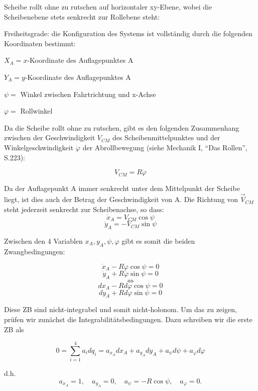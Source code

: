 \documentclass[10pt, letterpaper]{article}
\begin{document}
Scheibe rollt ohne zu rutschen auf horizontaler xy-Ebene, wobei die Scheibenebene stets senkrecht zur Rollebene steht:

Freiheitsgrade: die Konfiguration des Systems ist vollständig durch die folgenden Koordinaten bestimmt:

$X_A = x$-Koordinate des Auflagepunktes A

$Y_A = y$-Koordinate des Auflagepunktes A

$\psi = $ Winkel zwischen Fahrtrichtung und x-Achse

$\varphi = $ Rollwinkel

Da die Scheibe rollt ohne zu rutschen, gibt es den folgenden Zusammenhang zwischen der Geschwindigkeit $V_{CM}$ des Scheibenmittelpunktes und der Winkelgeschwindigkeit $\dot{\varphi}$ der Abrollbewegung (siehe Mechanik I, ``Das Rollen'', S.223):

\[V_{CM} = R \dot{\varphi}\]

Da der Auflagepunkt A immer senkrecht unter dem Mittelpunkt der Scheibe liegt, ist dies auch der Betrag der Geschwindigkeit von A. Die Richtung von $\vec{V}_{CM}$ steht jederzeit senkrecht zur Scheibenachse, so dass:
\[\dot{x}_A = V_{CM} \cos\psi\]
\[\dot{y}_A = -V_{CM} \sin\psi\]

Zwischen den 4 Variablen $x_A, y_A, \psi, \varphi$ gibt es somit die beiden Zwangbedingungen:

\[\dot{x}_A - R\dot{\varphi} \cos\psi = 0\]
\[\dot{y}_A + R\dot{\varphi} \sin\psi = 0\]
\[\Leftrightarrow\]
\[dx_A - R d\varphi \cos\psi = 0\]
\[dy_A + R d\varphi \sin\psi = 0\]

Diese ZB sind nicht-integrabel und somit nicht-holonom.
Um das zu zeigen, prüfen wir zunächst die Integrabilitätsbedingungen.
Dazu schreiben wir die erste ZB als

\[0 = \sum_{i=1}^4 a_i dq_i = a_{x_A} dx_A + a_{y_A} dy_A + a_\psi d\psi + a_\varphi d\varphi\]

d.h. \[a_{x_A} = 1, \quad a_{y_A} = 0, \quad a_\psi = -R\cos\psi, \quad a_\varphi = 0.\]
\end{document}
